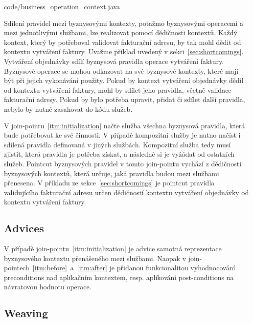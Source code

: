 
{code/business_operation_context.java}

Sdílení pravidel mezi byznysovými kontexty, potažmo byznysovými operacemi a mezi jednotlivými službami,
lze realizovat pomocí dědičnosti kontextů. Každý kontext, který by potřeboval validovat fakturační
adresu, by tak mohl dědit od kontextu vytváření faktury. Uvažme příklad uvedený v sekci~\ref{sec:shortcomings}.
Vytváření objednávky sdílí byznysová pravidla operace vytváření faktury. Byznysové operace se mohou odkazovat
na své byznysové kontexty, které mají být při jejich vykonávání použity. Pokud by kontext vytváření objednávky
dědil od kontextu vytváření faktury, mohl by sdílet jeho pravidla, včetně validace fakturační adresy. Pokud by bylo
potřeba upravit, přidat či sdílet další pravidla, nebylo by nutné zasahovat do kódu služeb.

V join-pointu~\ref{itm:initialization} načte služba všechna byznysová pravidla, která
bude potřebovat ke své činnosti. V případě kompozitní služby je nutno načíst i sdílená pravidla
definovaná v jiných službách. Kompozitní služba tedy musí zjistit, která pravidla je potřeba získat,
a následně si je vyžádat od ostatních služeb. Pointcut byznysových pravidel v tomto join-pointu vychází
z dědičnosti byznysových kontextů, která určuje, jaká pravidla budou mezi službami přenesena.
V příkladu ze sekce~\ref{sec:shortcomings} je pointcut pravidla validujícího fakturační adresu
určen dědičností kontextu vytváření objednávky od kontextu vytváření faktury.


\subsection{Advices}

V případě join-pointu~\ref{itm:initialization} je advice samotná reprezentace byznysového
kontextu přenášeného mezi službami. Naopak v join-pointech~\ref{itm:before}~a~\ref{itm:after}
je přidanou funkcionalitou vyhodnocování preconditions nad aplikačním kontextem, resp. aplikování
post-conditions na návratovou hodnotu operace.

\subsection{Weaving}

